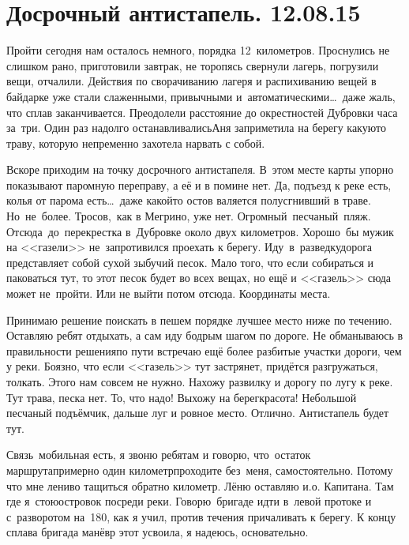 \chapter{Досрочный антистапель. 12.08.15}

Пройти сегодня нам осталось немного, порядка 12~километров. Проснулись не слишком рано, приготовили завтрак, не торопясь свернули лагерь, погрузили вещи, отчалили. Действия по сворачиванию лагеря и распихиванию вещей в байдарке уже стали слаженными, привычными и~автоматическими\ldots~даже жаль, что сплав заканчивается. Преодолели расстояние до окрестностей Дубровки часа за~три. Один раз надолго останавливались\mdash Аня заприметила на берегу какую\sdash то траву, которую непременно захотела нарвать с собой. 

Вскоре приходим на точку досрочного антистапеля. В~этом месте карты упорно показывают паромную переправу, а её и в помине нет. Да, подъезд к реке есть, колья от парома есть\ldots~даже какой\sdash то остов валяется полусгнивший в траве. Но~не~более. Тросов,~как в Мегрино, уже нет. Огромный~песчаный~пляж. Отсюда~до~перекрестка в~Дубровке около двух километров. Хорошо~бы мужик на <<газели>> не~запротивился проехать к берегу. Иду~в~разведку\mdash дорога представляет собой сухой зыбучий песок. Мало того, что если собираться и паковаться тут, то этот песок будет во всех вещах, но ещё и <<газель>> сюда может не~пройти. Или не выйти потом отсюда. Координаты места.

Принимаю решение поискать в пешем порядке лучшее место ниже по течению. Оставляю ребят отдыхать, а сам иду бодрым шагом по дороге. Не обманываюсь в правильности решения\mdash по пути встречаю ещё более разбитые участки дороги, чем у реки. Боязно, что если <<газель>> тут застрянет, придётся разгружаться, толкать. Этого нам совсем не нужно. Нахожу развилку и дорогу по лугу к реке. Тут трава, песка нет. То, что надо! Выхожу на берег\mdash красота! Небольшой песчаный подъёмчик, дальше луг и ровное место. Отлично. Антистапель будет тут. 

Связь~мобильная есть, я звоню ребятам и говорю, что~остаток маршрута\mdash примерно один километр\mdash проходите без~меня, самостоятельно. Потому что мне лениво тащиться обратно километр. Лёню оставляю и.о. Капитана. Там где я~стою\mdash островок посреди реки. Говорю~бригаде идти в~левой протоке и с~разворотом на~180\degree, как я учил, против течения причаливать к берегу. К концу сплава бригада манёвр этот усвоила, я надеюсь, основательно. 

